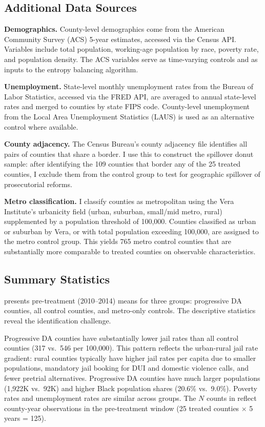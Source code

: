 \documentclass[12pt]{article}
\begin{document}
\subsection{Additional Data Sources}

\textbf{Demographics.} County-level demographics come from the American Community Survey (ACS) 5-year estimates, accessed via the Census API. Variables include total population, working-age population by race, poverty rate, and population density. The ACS variables serve as time-varying controls and as inputs to the entropy balancing algorithm.

\textbf{Unemployment.} State-level monthly unemployment rates from the Bureau of Labor Statistics, accessed via the FRED API, are averaged to annual state-level rates and merged to counties by state FIPS code. County-level unemployment from the Local Area Unemployment Statistics (LAUS) is used as an alternative control where available.

\textbf{County adjacency.} The Census Bureau's county adjacency file identifies all pairs of counties that share a border. I use this to construct the spillover donut sample: after identifying the 109 counties that border any of the 25 treated counties, I exclude them from the control group to test for geographic spillover of prosecutorial reforms.

\textbf{Metro classification.} I classify counties as metropolitan using the Vera Institute's urbanicity field (urban, suburban, small/mid metro, rural) supplemented by a population threshold of 100,000. Counties classified as urban or suburban by Vera, or with total population exceeding 100,000, are assigned to the metro control group. This yields 765 metro control counties that are substantially more comparable to treated counties on observable characteristics.

\subsection{Summary Statistics}

 presents pre-treatment (2010--2014) means for three groups: progressive DA counties, all control counties, and metro-only controls. The descriptive statistics reveal the identification challenge.

Progressive DA counties have substantially lower jail rates than all control counties (317 vs.\ 546 per 100,000). This pattern reflects the urban-rural jail rate gradient: rural counties typically have higher jail rates per capita due to smaller populations, mandatory jail booking for DUI and domestic violence calls, and fewer pretrial alternatives. Progressive DA counties have much larger populations (1,922K vs.\ 92K) and higher Black population shares (20.6\% vs.\ 9.0\%). Poverty rates and unemployment rates are similar across groups. The $N$ counts in  reflect county-year observations in the pre-treatment window (25 treated counties $\times$ 5 years = 125).
\end{document}
